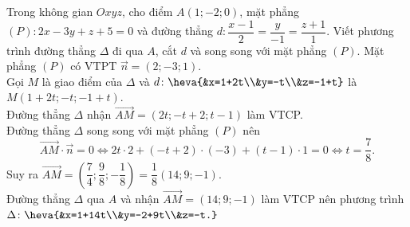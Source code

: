\begin{vd}%
	Trong không gian $Oxyz$, cho điểm $A(1;-2;0)$, mặt phẳng $(P)\colon 2x-3y+z+5=0$ và đường thẳng $d\colon \dfrac{x-1}{2}=\dfrac{y}{-1}=\dfrac{z+1}{1}$. Viết phương trình đường thẳng $\Delta$ đi qua $A$, cắt $d$ và song song với mặt phẳng $(P)$.
	\loigiai
	{
		Mặt phẳng $(P)$ có VTPT $\overrightarrow{n}=(2 ;-3 ; 1)$.\\
		Gọi $M$ là giao điểm của $\Delta$ và $d\colon \heva{&x=1+2t\\&y=-t\\&z=-1+t}$ là $M(1+2t ;-t ;-1+t)$.\\
		Đường thẳng $\Delta$ nhận $\overrightarrow{AM}=(2 t ;-t+2 ; t-1)$ làm VTCP.\\
		Đường thẳng $\Delta$ song song với mặt phẳng $(P)$ nên
		$$\overrightarrow{AM} \cdot \overrightarrow{n}=0 \Leftrightarrow 2t \cdot 2+(-t+2)\cdot(-3)+(t-1) \cdot 1=0 \Leftrightarrow t=\dfrac{7}{8}.$$
		Suy ra $\overrightarrow{AM}=\left(\dfrac{7}{4} ; \dfrac{9}{8} ;-\dfrac{1}{8}\right)=\dfrac{1}{8}(14 ; 9 ;-1)$.\\
		Đường thẳng $\Delta$ qua $A$ và nhận $\overrightarrow{AM}=(14 ; 9 ;-1)$ làm VTCP nên phương trình $\Delta\colon \heva{&x=1+14t\\&y=-2+9t\\&z=-t.}$	
	}
\end{vd}

